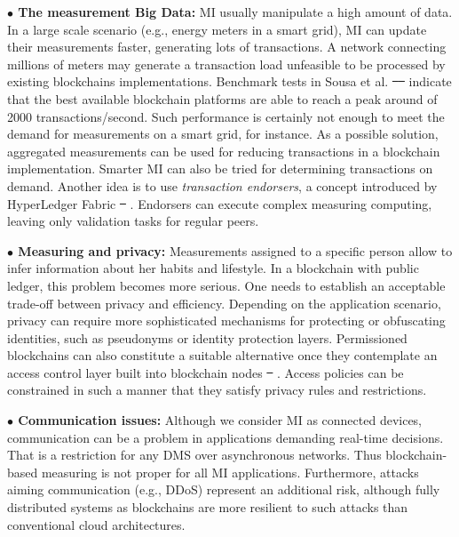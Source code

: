 \documentclass[journal]{IEEEtran} %
\providecommand{\DIFadd}[1]{{\protect\color{blue}\uwave{#1}}} %
\providecommand{\DIFdel}[1]{{\protect\color{red}\sout{#1}}}                      %
\providecommand{\DIFaddbegin}{} %
\providecommand{\DIFaddend}{} %
\providecommand{\DIFdelbegin}{} %
\providecommand{\DIFdelend}{} %
\begin{document}
\textbf{$\bullet$ The measurement Big Data:} MI usually manipulate a high amount of data. In a large scale scenario (e.g., energy meters in a smart grid), MI can update their measurements faster, generating lots of transactions. A network connecting millions of meters may generate a transaction load unfeasible to be processed by existing blockchains implementations. Benchmark tests in Sousa et al. \DIFdelbegin \DIFdel{\mbox{%
\cite{Sousa2017} }%
}\DIFdelend \DIFaddbegin \DIFadd{\mbox{%
\cite{Sousa2018} }%
}\DIFaddend indicate that the best available blockchain platforms are able to reach a peak around of 2000 transactions/second. Such performance is certainly not enough to meet the demand for measurements on a smart grid, for instance. As a possible solution, aggregated measurements can be used for reducing transactions in a blockchain implementation. Smarter MI can also be tried for determining transactions on demand. Another idea is to use \emph{transaction endorsers}, a concept introduced by HyperLedger Fabric \DIFdelbegin \DIFdel{\mbox{%
\cite{Vukolic2017a,Sousa2017}}%
}\DIFdelend \DIFaddbegin \DIFadd{\mbox{%
\cite{Sousa2018}}%
}\DIFaddend . Endorsers can execute complex measuring computing, leaving only validation tasks for regular peers.

\textbf{$\bullet$ Measuring and privacy:} Measurements assigned to a specific person allow to infer information about her habits and lifestyle. In a blockchain with public ledger, this problem becomes more serious. One needs to establish an acceptable trade-off between privacy and efficiency. Depending on the application scenario, privacy can require more sophisticated mechanisms for protecting or obfuscating identities, such as pseudonyms or identity protection layers. Permissioned blockchains can also constitute a suitable alternative once they contemplate an access control layer built into blockchain nodes \DIFdelbegin \DIFdel{\mbox{%
\cite{Vukolic2017a,Vukolic2016}}%
}\DIFdelend \DIFaddbegin \DIFadd{\mbox{%
\cite{Vukolic2016}}%
}\DIFaddend . Access policies can be constrained in such a manner that they satisfy privacy rules and restrictions.

\textbf{$\bullet$ Communication issues:} Although we consider MI as connected devices, communication can be a problem in applications demanding real-time decisions. That is a restriction for any DMS over asynchronous networks. Thus blockchain-based measuring is not proper for all MI applications. Furthermore, attacks aiming communication (e.g., DDoS) represent an additional risk, although fully distributed systems as blockchains are more resilient to such attacks than conventional cloud architectures.
\end{document}
